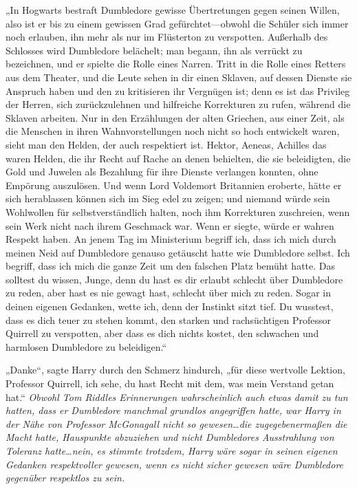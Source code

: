 „In Hogwarts bestraft Dumbledore gewisse Übertretungen gegen seinen Willen, also ist er bis zu einem gewissen Grad gefürchtet—obwohl die Schüler sich immer noch erlauben, ihn mehr als nur im Flüsterton zu verspotten. Außerhalb des Schlosses wird Dumbledore belächelt; man begann, ihn als verrückt zu bezeichnen, und er spielte die Rolle eines Narren. Tritt in die Rolle eines Retters aus dem Theater, und die Leute sehen in dir einen Sklaven, auf dessen Dienste sie Anspruch haben und den zu kritisieren ihr Vergnügen ist; denn es ist das Privileg der Herren, sich zurückzulehnen und hilfreiche Korrekturen zu rufen, während die Sklaven arbeiten. Nur in den Erzählungen der alten Griechen, aus einer Zeit, als die Menschen in ihren Wahnvorstellungen noch nicht so hoch entwickelt waren, sieht man den Helden, der auch respektiert ist. Hektor, Aeneas, Achilles das waren Helden, die ihr Recht auf Rache an denen behielten, die sie beleidigten, die Gold und Juwelen als Bezahlung für ihre Dienste verlangen konnten, ohne Empörung auszulösen. Und wenn Lord Voldemort Britannien eroberte, hätte er sich herablassen können sich im Sieg edel zu zeigen; und niemand würde sein Wohlwollen für selbstverständlich halten, noch ihm Korrekturen zuschreien, wenn sein Werk nicht nach ihrem Geschmack war. Wenn er siegte, würde er wahren Respekt haben. An jenem Tag im Ministerium begriff ich, dass ich mich durch meinen Neid auf Dumbledore genauso getäuscht hatte wie Dumbledore selbst. Ich begriff, dass ich mich die ganze Zeit um den falschen Platz bemüht hatte. Das solltest du wissen, Junge, denn du hast es dir erlaubt schlecht über Dumbledore zu reden, aber hast es nie gewagt hast, schlecht über mich zu reden. Sogar in deinen eigenen Gedanken, wette ich, denn der Instinkt sitzt tief. Du wusstest, dass es dich teuer zu stehen kommt, den starken und rachsüchtigen Professor Quirrell zu verspotten, aber dass es dich nichts kostet, den schwachen und harmlosen Dumbledore zu beleidigen.“

„Danke“, sagte Harry durch den Schmerz hindurch, „für diese wertvolle Lektion, Professor Quirrell, ich sehe, du hast Recht mit dem, was mein Verstand getan hat.“
\emph{Obwohl Tom Riddles Erinnerungen wahrscheinlich auch etwas damit zu tun hatten, dass er Dumbledore manchmal grundlos angegriffen hatte, war Harry in der Nähe von Professor McGonagall nicht so gewesen…die zugegebenermaßen die Macht hatte, Hauspunkte abzuziehen und nicht Dumbledores Ausstrahlung von Toleranz hatte…nein, es stimmte trotzdem, Harry wäre sogar in seinen eigenen Gedanken respektvoller gewesen, wenn es nicht \emph{sicher} gewesen wäre Dumbledore gegenüber respektlos zu sein.}

